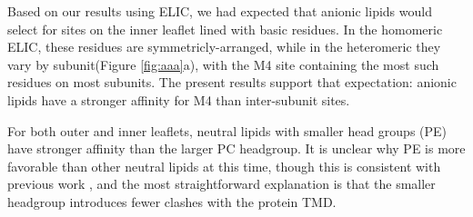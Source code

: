 

Based on our results using ELIC\cite{Tong2019}, we had expected that anionic lipids would select for sites on the inner leaflet lined with basic residues.  In the homomeric ELIC, these residues are symmetricly-arranged, while in the heteromeric \nachr{} they vary by subunit(Figure \ref{fig:aaa}a), with the M4 site containing the most such residues on most subunits. The present results support that expectation: %
anionic lipids have a stronger affinity for M4 than inter-subunit sites.  %

For both outer and inner leaflets, neutral lipids with smaller head groups (PE) have stronger affinity than the larger PC headgroup. It is unclear why PE is more favorable than other neutral lipids at this time, though this is consistent with previous work \cite{Sharp2019,Tong2019}, and the most straightforward explanation is that the smaller headgroup introduces fewer clashes with the protein TMD. %

